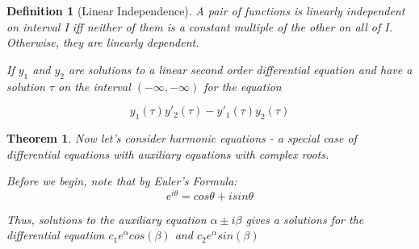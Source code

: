 \documentclass[12pt]{report}
\newtheorem{thm}{Theorem}
\newtheorem{dfn}{Definition}
\begin{document}
\begin{dfn}[Linear Independence]
A pair of functions is linearly independent on interval I iff neither of them is a constant multiple of the other on all of I. Otherwise, they are linearly dependent.

If $y_1$ and $y_2$ are solutions to a linear second order differential equation and have a solution $\tau$ on the interval $(-\infty, -\infty)$ for the equation

\begin{equation}
y_1(\tau)y'_2(\tau)-y'_1(\tau)y_2(\tau)
\end{equation}

\end{dfn}

\begin{thm}
Now let's consider harmonic equations - a special case of differential equations with auxiliary equations with complex roots.

Before we begin, note that by Euler's Formula:
\begin{equation}
e^{i\theta}=cos\theta + i sin\theta
\end{equation}

Thus, solutions to the auxiliary equation $\alpha \pm i\beta$ gives a solutions for the differential equation $c_1e^\alpha cos(\beta)$ and $c_2e^\alpha sin(\beta)$

\end{thm}
\end{document}
